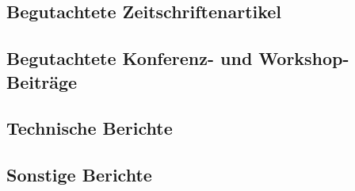 \begingroup
\BiblatexSplitbibDefernumbersWarningOff    
{}
  {\list
     {}
     {\setlength{\leftmargin}{\bibhang}%
      \setlength{\itemindent}{-\leftmargin}%
      \setlength{\itemsep}{\bibitemsep}%
      \setlength{\parsep}{\bibparsep}}}
  {\endlist}
  {\item}
\sloppy
\nocite{ananieva2018a}
\nocite{ananieva2019a}
\nocite{ananieva2019dagstuhl}
\nocite{ananieva2020c}
\nocite{gleitze2021orchestration-FASE}
\nocite{guissouma2018study}
\nocite{heinrich2018icse}
\nocite{klare2016a}
\nocite{klare2017models}
\nocite{klare2018docsym}
\nocite{klare2019dagstuhl}
\nocite{klare2019icmt}
\nocite{klare2019models}
\nocite{klare2019modelsward}
\nocite{klare2020compatibility-report}
\nocite{klare2021Vitruv-JSS}
\nocite{kramer2016c}
\nocite{meier2019modelsward}
\nocite{meier2020ccis}
\nocite{sax2017survey}
\nocite{yurchenko2017architecture}
\subsection*{Begutachtete Zeitschriftenartikel}
\printbibliography[heading=none,env=bibnonum,type=article]
\subsection*{Begutachtete Konferenz- und Workshop-Beiträge}
\printbibliography[heading=none,env=bibnonum,,type=inproceedings]
\subsection*{Technische Berichte}
\printbibliography[heading=none,env=bibnonum,,type=report]
\subsection*{Sonstige Berichte}
\printbibliography[heading=none,env=bibnonum,,type=incollection]
\endgroup
